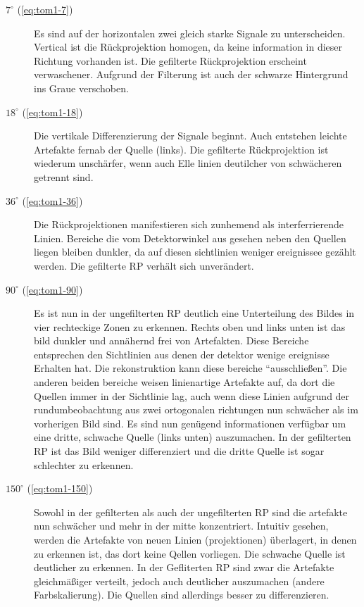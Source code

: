 \documentclass[slug=PET, room=Andreas-Schubert-Bau\,\ 424A, supervisor=Carsten\ Bittrich, coursedate=10.\ 01.\ 2020]{../../Lab_Report_LaTeX/lab_report}
\begin{document}
\begin{description}
\item[\(7^\circ\) (\ref{eq:tom1-7})] Es sind auf der horizontalen
  zwei gleich starke Signale zu unterscheiden. Vertical ist die
  R\"uckprojektion homogen, da keine information in dieser Richtung
  vorhanden ist. Die gefilterte R\"uckprojektion erscheint
  verwaschener. Aufgrund der Filterung ist auch der schwarze
  Hintergrund ins Graue verschoben.

\item[\(18^\circ\) (\ref{eq:tom1-18})] Die vertikale Differenzierung
  der Signale beginnt. Auch entstehen leichte Artefakte fernab der
  Quelle (links). Die gefilterte R\"uckprojektion ist wiederum
  unsch\"arfer, wenn auch Elle linien deutilcher von schw\"acheren
  getrennt sind.

\item[\(36^\circ\) (\ref{eq:tom1-36})] Die R\"uckprojektionen
  manifestieren sich zunhemend als interferrierende Linien. Bereiche
  die vom Detektorwinkel aus gesehen neben den Quellen liegen bleiben
  dunkler, da auf diesen sichtlinien weniger ereignissee gez\"ahlt
  werden. Die gefilterte RP verh\"alt sich unver\"andert.

\item[\(90^\circ\) (\ref{eq:tom1-90})] Es ist nun in der ungefilterten
  RP deutlich eine Unterteilung des Bildes in vier rechteckige Zonen
  zu erkennen. Rechts oben und links unten ist das bild dunkler und
  ann\"ahernd frei von Artefakten. Diese Bereiche entsprechen den
  Sichtlinien aus denen der detektor wenige ereignisse Erhalten
  hat. Die rekonstruktion kann diese bereiche
  ``ausschlie\ss{}en''. Die anderen beiden bereiche weisen
  linienartige Artefakte auf, da dort die Quellen immer in der
  Sichtlinie lag, auch wenn diese Linien aufgrund der
  rundumbeobachtung aus zwei ortogonalen richtungen nun schw\"acher
  als im vorherigen Bild sind. Es sind nun gen\"ugend informationen
  verf\"ugbar um eine dritte, schwache Quelle (links unten)
  auszumachen. In der gefilterten RP ist das Bild weniger
  differenziert und die dritte Quelle ist sogar schlechter zu
  erkennen.
\item[\(150^\circ\) (\ref{eq:tom1-150})] Sowohl in der gefilterten als
  auch der ungefilterten RP sind die artefakte nun schw\"acher und
  mehr in der mitte konzentriert.  Intuitiv gesehen, werden die
  Artefakte von neuen Linien (projektionen) \"uberlagert, in denen zu
  erkennen ist, das dort keine Qellen vorliegen. Die schwache Quelle
  ist deutlicher zu erkennen.  In der Gefliterten RP sind zwar die
  Artefakte gleichm\"a\ss{}iger verteilt, jedoch auch deutlicher
  auszumachen (andere Farbskalierung). Die Quellen sind allerdings
  besser zu differenzieren.


\end{description}
\end{document}
